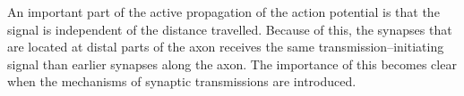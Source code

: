 		An important part of the active propagation of the action potential is that the signal is independent of the distance travelled.
		Because of this, the synapses that are located at distal parts of the axon receives the same transmission--initiating signal than earlier synapses along the axon.
		The importance of this becomes clear when the mechanisms of synaptic transmissions are introduced. %








% 	
% 
% 
% 
% 
% 	
% 
